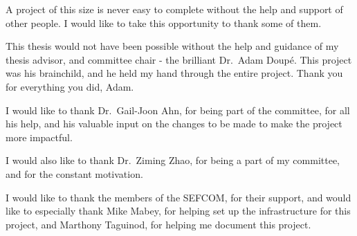 A project of this size is never easy to complete without the help and support of other people. I would like to take this opportunity to thank some of them.

This thesis would not have been possible without the help and guidance of my thesis advisor, and committee chair - the brilliant Dr.~Adam Doup\'{e}.
This project was his brainchild, and he held my hand through the entire project. Thank you for everything you did, Adam.

I would like to thank Dr.~Gail-Joon Ahn, for being part of the committee, for all his help, and his valuable input on the changes to be made to make the project more impactful.

I would also like to thank Dr.~Ziming Zhao, for being a part of my committee, and for the constant motivation.

I would like to thank the members of the SEFCOM, for their support, and would like to especially thank Mike Mabey, for helping set up the infrastructure for this project, and Marthony Taguinod, for helping me document this project.